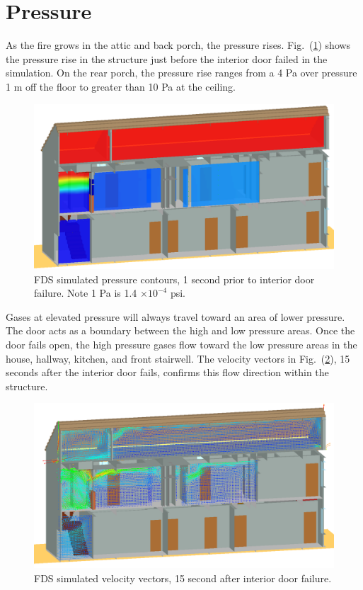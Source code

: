 \documentclass[11pt,oneside]{book}
\begin{document}
\section{Pressure}
As the fire grows in the attic and back porch, the pressure rises. Fig.~(\ref{fig:pres_159s}) shows the pressure rise in the structure just before the interior door failed in the simulation. On the rear porch, the pressure rise ranges from a 4 Pa over pressure 1 m off the floor to greater than 10 Pa at the ceiling.
\begin{figure}[!ht]
\includegraphics[width=.75\textwidth]{../Figures/west_50th_baseline_pres2}

\caption{FDS simulated pressure contours, 1 second prior to interior door failure. Note 1 Pa is 1.4 $\times 10 ^{-4}$ psi.}
\label{fig:pres_159s}
\end{figure}
Gases at elevated pressure will always travel toward an area of lower pressure. The door acts as a boundary between the high and low pressure areas. Once the door fails open, the high pressure gases flow toward the low pressure areas in the house, hallway, kitchen, and front stairwell. The velocity vectors in Fig.~(\ref{fig:velo_175s}), 15 seconds after the interior door fails, confirms this flow direction within the structure.
\begin{figure}[!ht]
\includegraphics[width=.675\textwidth]{../Figures/west_50th_baseline_velo_175}


\caption{FDS simulated velocity vectors, 15 second after interior door failure.}
\label{fig:velo_175s}
\end{figure}
\end{document}
